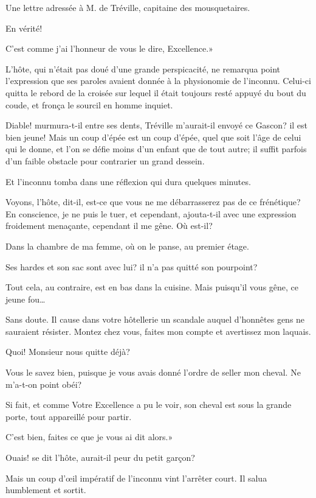 \speak  Une lettre adressée à M. de Tréville, capitaine des mousquetaires. 

\speak  En vérité! 

\speak  C'est comme j'ai l'honneur de vous le dire, Excellence.» 

L'hôte, qui n'était pas doué d'une grande perspicacité, ne remarqua point l'expression que ses paroles avaient donnée à la physionomie de l'inconnu. Celui-ci quitta le rebord de la croisée sur lequel il était toujours resté appuyé du bout du coude, et fronça le sourcil en homme inquiet. 

\speak  Diable! murmura-t-il entre ses dents, Tréville m'aurait-il envoyé ce Gascon? il est bien jeune! Mais un coup d'épée est un coup d'épée, quel que soit l'âge de celui qui le donne, et l'on se défie moins d'un enfant que de tout autre; il suffit parfois d'un faible obstacle pour contrarier un grand dessein. 

Et l'inconnu tomba dans une réflexion qui dura quelques minutes. 

\speak  Voyons, l'hôte, dit-il, est-ce que vous ne me débarrasserez pas de ce frénétique? En conscience, je ne puis le tuer, et cependant, ajouta-t-il avec une expression froidement menaçante, cependant il me gêne. Où est-il? 

\speak  Dans la chambre de ma femme, où on le panse, au premier étage. 

\speak  Ses hardes et son sac sont avec lui? il n'a pas quitté son pourpoint? 

\speak  Tout cela, au contraire, est en bas dans la cuisine. Mais puisqu'il vous gêne, ce jeune fou\dots 

\speak  Sans doute. Il cause dans votre hôtellerie un scandale auquel d'honnêtes gens ne sauraient résister. Montez chez vous, faites mon compte et avertissez mon laquais. 

\speak  Quoi! Monsieur nous quitte déjà? 

\speak  Vous le savez bien, puisque je vous avais donné l'ordre de seller mon cheval. Ne m'a-t-on point obéi? 

\speak  Si fait, et comme Votre Excellence a pu le voir, son cheval est sous la grande porte, tout appareillé pour partir. 

\speak  C'est bien, faites ce que je vous ai dit alors.» 

\speak  Ouais! se dit l'hôte, aurait-il peur du petit garçon? 

Mais un coup d'œil impératif de l'inconnu vint l'arrêter court. Il salua humblement et sortit. 

